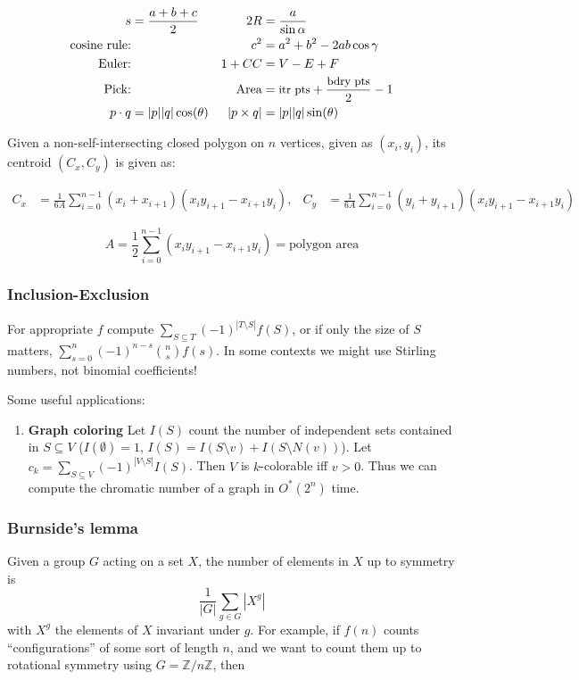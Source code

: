 \documentclass[
	a4paper,
	landscape,
	10pt,
]{article}
\begin{document}
\begin{multicols}{3}
		\begin{align*}
			s &= \frac {a+b+c}2 & 2R &=\frac{a}{\sin \alpha}\\
			\textrm{cosine rule:}&&  c^2 &= a^2 + b^2 - 2ab\cos \gamma\\
			\textrm{Euler:}&&  1 + CC &= V - E + F\\
            \textrm{Pick:}&& \textrm{Area} &= {\small \textrm{itr pts}
            + \frac{\textrm{bdry pts}}2 - 1}\\
			p\cdot q &= |p||q|\cos(\theta) & |p\times q| &= |p||q|\sin(\theta)\\
		\end{align*}

		Given a non-self-intersecting closed polygon on $n$ vertices, given as $(x_i, y_i)$, its centroid $(C_x, C_y)$ is given as:

		\begin{align*}
			C_x &= \frac{1}{6A} \sum_{i = 0}^{n - 1} (x_i + x_{i+1}) (x_i y_{i+1} - x_{i+1} y_i), &
			C_y &= \frac{1}{6A} \sum_{i = 0}^{n - 1} (y_i + y_{i+1}) (x_i y_{i+1} - x_{i+1} y_i)
		\end{align*}

		\begin{equation*}
			A = \frac{1}{2} \sum_{i = 0}^{n - 1} (x_i y_{i+1} - x_{i+1} y_i) = \textrm{polygon area}
		\end{equation*}

		\subsubsection*{Inclusion-Exclusion}
		For appropriate $f$ compute $\sum_{S\subseteq T} (-1)^{|T\setminus S|} f(S)$,
		or if only the size of $S$ matters, $\sum_{s=0}^n (-1)^{n-s} \binom{n}{s}f(s)$.
		In some contexts we might use Stirling numbers, not binomial coefficients!

		Some useful applications:
		\begin{enumerate}
			\item[] \textbf{Graph coloring} Let $I(S)$ count the number
				of independent sets
				contained in $S \subseteq V$ ($I(\emptyset) = 1$,
				$I(S) = I(S\setminus v) + I(S\setminus N(v))$). Let
				$c_k = \sum_{S\subseteq V} (-1)^{|V\setminus S|} I(S)$. Then $V$
				is $k$-colorable iff $v > 0$. Thus we can compute the chromatic
				number of a graph in $O^*(2^n)$ time.
		\end{enumerate}

		\subsubsection*{Burnside's lemma}
		Given a group $G$ acting on a set $X$, the number of elements in $X$ up to
		symmetry is $$\frac{1}{|G|}\sum_{g\in G} |X^g|$$ with $X^g$ the elements of
		$X$ invariant under $g$. For example, if $f(n)$ counts ``configurations''
		of some sort of length $n$, and we want to count them up to rotational symmetry
		using $G = \mathbb{Z}/n\mathbb{Z}$, then


\end{multicols}
\end{document}
